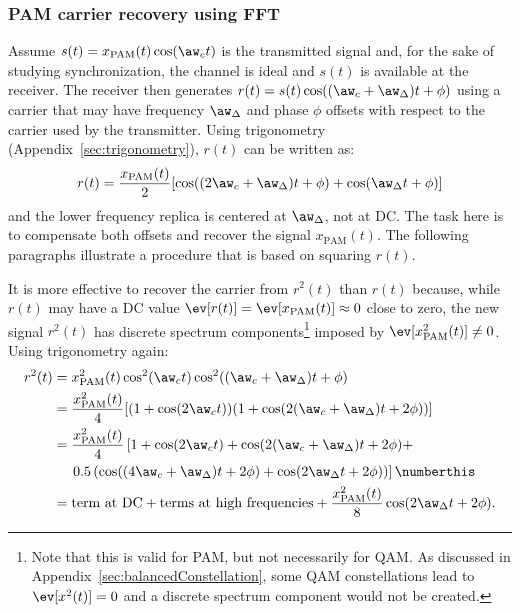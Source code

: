 \subsubsection{PAM carrier recovery using FFT}

Assume $s(t) = x_\textrm{PAM}(t) \cos(\aw_c t)$ is the transmitted signal and, for the sake of studying synchronization, the channel is ideal and $s(t)$ is available at the receiver. The
receiver then generates $r(t) = s(t) \cos((\aw_c +\aw_{\Delta}) t + \phi)$ using a carrier that
may have frequency $\aw_{\Delta}$ and phase $\phi$ offsets with respect to the carrier used by the transmitter. Using trigonometry (Appendix~\ref{sec:trigonometry}), $r(t)$ can be written as:
\[
r(t) = \frac{x_\textrm{PAM}(t)}{2} [ \cos((2\aw_c +\aw_{\Delta}) t + \phi)  + \cos(\aw_{\Delta} t + \phi) ]
\]
and the lower frequency replica is centered at $\aw_{\Delta}$, not at DC.
The task here is to compensate both offsets and recover the signal $x_\textrm{PAM}(t)$. 
The following paragraphs illustrate a procedure that is based on squaring $r(t)$. 

It is more effective to recover the carrier from $r^2(t)$ than $r(t)$ because, while $r(t)$ may have a DC value $\ev[r(t)] = \ev[x_\textrm{PAM}(t)] \approx 0$ close to zero, the new signal $r^2(t)$ has discrete spectrum components\footnote{Note that this is valid for PAM, but not necessarily for QAM. As discussed in Appendix~\ref{sec:balancedConstellation}, some QAM constellations lead to $\ev[x^2(t)]=0$ and a discrete spectrum component would not be created.} imposed by $\ev[x^2_\textrm{PAM}(t)] \ne 0$.
Using trigonometry again:
\begin{align*} %
r^2(t) &= x^2_\textrm{PAM}(t) \cos^2(\aw_c t) \cos^2((\aw_c +\aw_{\Delta}) t + \phi) \\
			 &= \frac{x^2_\textrm{PAM}(t)}{4} [(1 + \cos(2 \aw_c t))(1 + \cos(2(\aw_c +\aw_{\Delta}) t + 2\phi))] \\
       &= \frac{x^2_\textrm{PAM}(t)}{4} \left[ 1 + \cos(2 \aw_c t) + \cos(2(\aw_c +\aw_{\Delta}) t + 2\phi) + \right.\\
			&\mathrel{\phantom{=}} \left. 0.5 \left( \cos((4 \aw_c + \aw_{\Delta}) t + 2\phi)+  \cos(2\aw_{\Delta} t + 2\phi) \right) \right] \numberthis \label{eq:squaredPAM} \\
			&= \textrm{term at DC} + \textrm{terms at high frequencies} + \frac{x^2_\textrm{PAM}(t)}{8} \cos(2\aw_{\Delta} t + 2\phi).  
\end{align*} %


